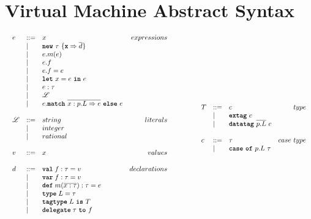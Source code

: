 \documentclass{article}
\newcommand{\keyw}[1]{\texttt{\textbf{#1}}}
\begin{document}
\section{Virtual Machine Abstract Syntax}

\[
\begin{array}{lll}
\begin{array}{lllr}
e & ::= & x & expressions \\
& | & \keyw{new}~\tau~\{\keyw{x} \Rightarrow \overline{d}\}&\\
& | & e.m(e) &\\
& | & e.f &\\
& | & e.f = e&\\
& | & \keyw{let}~x=e~\keyw{in}~e &\\
& | & e : \tau&\\
& | & \mathscr{L} &\\
& | & e.\keyw{match}~\overline{x:p.L \Rightarrow e}~\keyw{else}~e &\\
&&\\
\mathscr{L} & ::= & string & literals \\
& | & integer &\\
& | & rational &\\
&&\\
v & ::= & x & values \\
&&\\
d & ::= & \keyw{val} \; f : \tau = v & declarations \\
  & |   & \keyw{var} \; f : \tau = v &\\
  & |   & \keyw{def} \; m(\overline{x:\tau}) : \tau = e &\\
  & |   & \keyw{type} \; L = \tau &\\
  & |   & \keyw{tagtype} \; L~\keyw{is}~T &\\
  & |   & \keyw{delegate} \; \tau~\keyw{to}~f &\\
&&\\
\end{array}
& ~~~~~~
&
\begin{array}{lllr}
T & ::= & c & type \\
& | & \keyw{extag}~c &\\
& | & \keyw{datatag}~\overline{p.L}~c &\\
&&\\
c & ::= & \tau & case ~ type \\
& | & \keyw{case}~\keyw{of}~p.L~\tau &\\

\end{array}
\end{array}\]
\end{document}
